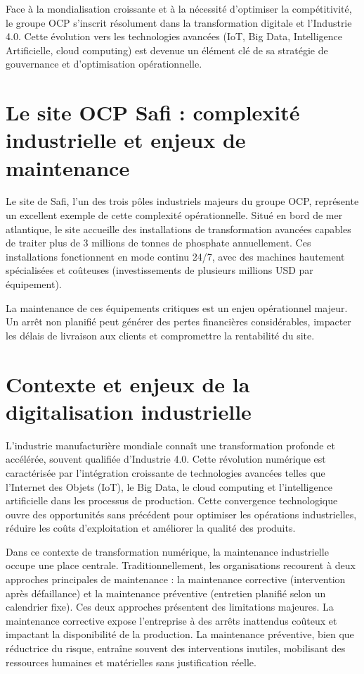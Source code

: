 \documentclass[a4paper,12pt,twoside]{report}
\begin{document}
Face à la mondialisation croissante et à la nécessité d'optimiser la compétitivité, le groupe OCP s'inscrit résolument dans la transformation digitale et l'Industrie 4.0. Cette évolution vers les technologies avancées (IoT, Big Data, Intelligence Artificielle, cloud computing) est devenue un élément clé de sa stratégie de gouvernance et d'optimisation opérationnelle.

\section*{Le site OCP Safi : complexité industrielle et enjeux de maintenance}

Le site de Safi, l'un des trois pôles industriels majeurs du groupe OCP, représente un excellent exemple de cette complexité opérationnelle. Situé en bord de mer atlantique, le site accueille des installations de transformation avancées capables de traiter plus de 3 millions de tonnes de phosphate annuellement. Ces installations fonctionnent en mode continu 24/7, avec des machines hautement spécialisées et coûteuses (investissements de plusieurs millions USD par équipement).

La maintenance de ces équipements critiques est un enjeu opérationnel majeur. Un arrêt non planifié peut générer des pertes financières considérables, impacter les délais de livraison aux clients et compromettre la rentabilité du site.

\section*{Contexte et enjeux de la digitalisation industrielle}

L'industrie manufacturière mondiale connaît une transformation profonde et accélérée, souvent qualifiée d'Industrie 4.0. Cette révolution numérique est caractérisée par l'intégration croissante de technologies avancées telles que l'Internet des Objets (IoT), le Big Data, le cloud computing et l'intelligence artificielle dans les processus de production. Cette convergence technologique ouvre des opportunités sans précédent pour optimiser les opérations industrielles, réduire les coûts d'exploitation et améliorer la qualité des produits.

Dans ce contexte de transformation numérique, la maintenance industrielle occupe une place centrale. Traditionnellement, les organisations recourent à deux approches principales de maintenance : la maintenance corrective (intervention après défaillance) et la maintenance préventive (entretien planifié selon un calendrier fixe). Ces deux approches présentent des limitations majeures. La maintenance corrective expose l'entreprise à des arrêts inattendus coûteux et impactant la disponibilité de la production. La maintenance préventive, bien que réductrice du risque, entraîne souvent des interventions inutiles, mobilisant des ressources humaines et matérielles sans justification réelle.
\end{document}
